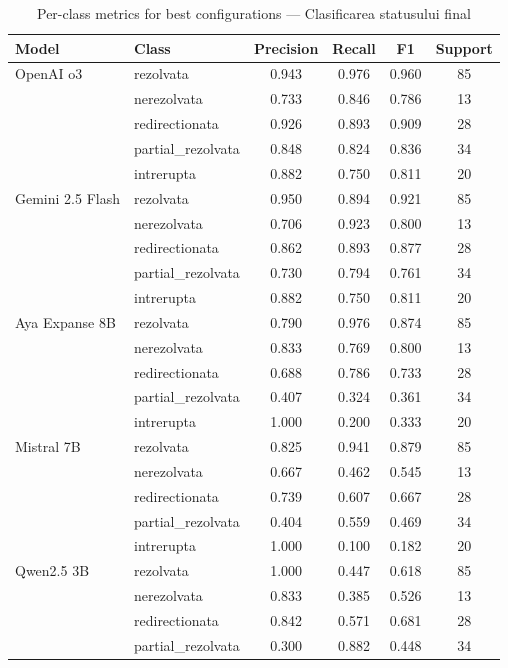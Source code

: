 \begin{table}[H]
\centering
\footnotesize
\caption{Per-class metrics for best configurations — Clasificarea statusului final}
\label{tab:per-class-final-status-classification}
\begin{tabular}{llcccc}
\toprule
\textbf{Model} & \textbf{Class} & \textbf{Precision} & \textbf{Recall} & \textbf{F1} & \textbf{Support} \\
\midrule
OpenAI o3 & rezolvata & 0.943 & 0.976 & 0.960 & 85 \\
 & nerezolvata & 0.733 & 0.846 & 0.786 & 13 \\
 & redirectionata & 0.926 & 0.893 & 0.909 & 28 \\
 & partial\_rezolvata & 0.848 & 0.824 & 0.836 & 34 \\
 & intrerupta & 0.882 & 0.750 & 0.811 & 20 \\
\midrule
Gemini 2.5 Flash & rezolvata & 0.950 & 0.894 & 0.921 & 85 \\
 & nerezolvata & 0.706 & 0.923 & 0.800 & 13 \\
 & redirectionata & 0.862 & 0.893 & 0.877 & 28 \\
 & partial\_rezolvata & 0.730 & 0.794 & 0.761 & 34 \\
 & intrerupta & 0.882 & 0.750 & 0.811 & 20 \\
\midrule
Aya Expanse 8B & rezolvata & 0.790 & 0.976 & 0.874 & 85 \\
 & nerezolvata & 0.833 & 0.769 & 0.800 & 13 \\
 & redirectionata & 0.688 & 0.786 & 0.733 & 28 \\
 & partial\_rezolvata & 0.407 & 0.324 & 0.361 & 34 \\
 & intrerupta & 1.000 & 0.200 & 0.333 & 20 \\
\midrule
Mistral 7B & rezolvata & 0.825 & 0.941 & 0.879 & 85 \\
 & nerezolvata & 0.667 & 0.462 & 0.545 & 13 \\
 & redirectionata & 0.739 & 0.607 & 0.667 & 28 \\
 & partial\_rezolvata & 0.404 & 0.559 & 0.469 & 34 \\
 & intrerupta & 1.000 & 0.100 & 0.182 & 20 \\
\midrule
Qwen2.5 3B & rezolvata & 1.000 & 0.447 & 0.618 & 85 \\
 & nerezolvata & 0.833 & 0.385 & 0.526 & 13 \\
 & redirectionata & 0.842 & 0.571 & 0.681 & 28 \\
 & partial\_rezolvata & 0.300 & 0.882 & 0.448 & 34 \\

\end{tabular}
\end{table}
